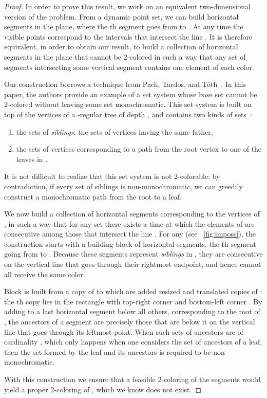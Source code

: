 \documentclass[11pt,a4paper]{amsart}
\renewenvironment{itemize}{\begin{enumerate}[label=, noitemsep, topsep=1.5mm, labelindent=.8em, leftmargin=*, widest=.]}{\end{enumerate}}
\theoremstyle{plain}
\theoremstyle{definition}
\begin{document}
\begin{proof}
In order to prove this result, we work on an equivalent two-dimensional version of the problem. From a dynamic point set, we can build  horizontal segments in the plane, where the th segment goes from  to . At any time  the visible points  correspond to the intervals that intersect the line . It is therefore equivalent, in order to obtain our result, to build a collection of horizontal segments in the plane that cannot be 2-colored in such a way that any set of  segments intersecting some vertical segment contains one element of each color.

Our construction borrows a technique from Pach, Tardos, and T\'oth~\cite{PTT05}. In this paper, the authors provide an example of a set system whose base set cannot be 2-colored without leaving some set monochromatic. This set system  is built on top of the  vertices of a -regular tree  of depth , and contains two kinds of sets~:
\begin{itemize}
\item the  sets of {\it siblings}: the sets of  vertices having the same father,
\item the  sets of  vertices corresponding to a path from the root vertex to one of the leaves in .
\end{itemize}
It is not difficult to realize that this set system is not 2-colorable: by contradiction, if every set of siblings is non-monochromatic, we can greedily construct a monochromatic path from the root to  a leaf.

We now build a collection of horizontal segments corresponding to the vertices of , in such a way that for any set  there exists a time  at which the elements of  are consecutive among those that intersect the line . For any  (see \figurename~\ref{fig:imposs}), the construction starts with a building block  of  horizontal segments, the th segment going from  to . Because these  segments represent {\it siblings} in , they are consecutive on the vertical line that goes through their rightmost endpoint, and hence cannot all receive the same color.





Block  is built from a copy of  to which are added
 resized and translated copies of  : the th copy lies in
the rectangle with top-right corner  and
bottom-left corner .
By adding to  a last horizontal segment below all others,
corresponding to the root of , the ancestors of a
segment are precisely those that are below it on the vertical line
that goes through its leftmost point.
When such sets of ancestors are of cardinality , which only
happens when one considers the set of ancestors of a leaf, then the
set formed by the leaf and its ancestors is required to be
non-monochromatic.

With this construction we ensure that a feasible 2-coloring of the
segments would yield a proper 2-coloring of , which we
know does not exist.
\end{proof}
\end{document}
